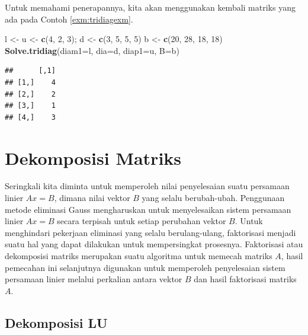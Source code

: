 \documentclass[]{book}
\newenvironment{Shaded}{\begin{snugshade}}{\end{snugshade}}
\newcommand{\DataTypeTok}[1]{\textcolor[rgb]{0.13,0.29,0.53}{#1}}
\newcommand{\DecValTok}[1]{\textcolor[rgb]{0.00,0.00,0.81}{#1}}
\newcommand{\KeywordTok}[1]{\textcolor[rgb]{0.13,0.29,0.53}{\textbf{#1}}}
\newcommand{\NormalTok}[1]{#1}
\newcommand{\StringTok}[1]{\textcolor[rgb]{0.31,0.60,0.02}{#1}}
\theoremstyle{definition}
\theoremstyle{definition}
\theoremstyle{definition}
\theoremstyle{remark}
\begin{document}
Untuk memahami penerapannya, kita akan menggunakan kembali matriks yang ada pada Contoh \ref{exm:tridiagexm}.

\begin{Shaded}
\begin{Highlighting}[]
\NormalTok{l <-}\StringTok{ }\NormalTok{u <-}\StringTok{ }\KeywordTok{c}\NormalTok{(}\DecValTok{4}\NormalTok{, }\DecValTok{2}\NormalTok{, }\DecValTok{3}\NormalTok{); d <-}\StringTok{ }\KeywordTok{c}\NormalTok{(}\DecValTok{3}\NormalTok{, }\DecValTok{5}\NormalTok{, }\DecValTok{5}\NormalTok{, }\DecValTok{5}\NormalTok{)}
\NormalTok{b <-}\StringTok{ }\KeywordTok{c}\NormalTok{(}\DecValTok{20}\NormalTok{, }\DecValTok{28}\NormalTok{, }\DecValTok{18}\NormalTok{, }\DecValTok{18}\NormalTok{)}
\KeywordTok{Solve.tridiag}\NormalTok{(}\DataTypeTok{diam1=}\NormalTok{l, }\DataTypeTok{dia=}\NormalTok{d, }\DataTypeTok{diap1=}\NormalTok{u, }\DataTypeTok{B=}\NormalTok{b)}
\end{Highlighting}
\end{Shaded}

\begin{verbatim}
##      [,1]
## [1,]    4
## [2,]    2
## [3,]    1
## [4,]    3
\end{verbatim}

\hypertarget{dekomposisimatriks}{%
\section{Dekomposisi Matriks}\label{dekomposisimatriks}}

Seringkali kita diminta untuk memperoleh nilai penyelesaian suatu persamaan linier \(Ax=B\), dimana nilai vektor \(B\) yang selalu berubah-ubah. Penggunaan metode eliminasi Gauss mengharuskan untuk menyelesaikan sistem persamaan linier \(Ax=B\) secara terpisah untuk setiap perubahan vektor \(B\). Untuk menghindari pekerjaan eliminasi yang selalu berulang-ulang, faktorisasi menjadi suatu hal yang dapat dilakukan untuk mempersingkat prosesnya. Faktorisasi atau dekomposisi matriks merupakan suatu algoritma untuk memecah matriks \(A\), hasil pemecahan ini selanjutnya digunakan untuk memperoleh penyelesaian sistem persamaan linier melalui perkalian antara vektor \(B\) dan hasil faktorisasi matriks \(A\).

\hypertarget{ludecomp}{%
\subsection{Dekomposisi LU}\label{ludecomp}}
\end{document}
